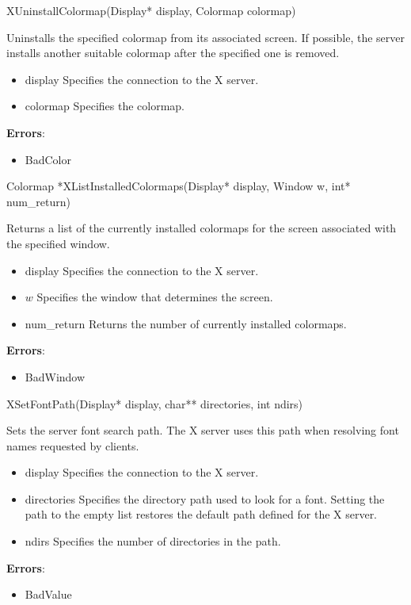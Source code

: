 \documentclass{report}
\begin{document}
\begin{itemize}
        \begin{cppcode}
            XUninstallColormap(Display* display, Colormap colormap)
        \end{cppcode}
        \bigbreak \noindent
        Uninstalls the specified colormap from its associated screen. If possible, the server installs another suitable colormap after the specified one is removed.
        \begin{itemize}
            \item display Specifies the connection to the X server.
            \item colormap Specifies the colormap.
        \end{itemize}
        \bigbreak \noindent
        \textbf{Errors}:
        \begin{itemize}
            \item BadColor
        \end{itemize}

        \begin{cppcode}
        Colormap *XListInstalledColormaps(Display* display, Window w, int* num_return)
        \end{cppcode}
        \bigbreak \noindent
        Returns a list of the currently installed colormaps for the screen associated with the specified window.
        \begin{itemize}
            \item display Specifies the connection to the X server.
            \item $w$ Specifies the window that determines the screen.
            \item num\_return Returns the number of currently installed colormaps.
        \end{itemize}
        \bigbreak \noindent
        \textbf{Errors}:
        \begin{itemize}
            \item BadWindow
        \end{itemize}

        \begin{cppcode}
        XSetFontPath(Display* display, char** directories, int ndirs)
        \end{cppcode}
        \bigbreak \noindent
        Sets the server font search path. The X server uses this path when resolving font names requested by clients.
        \begin{itemize}
            \item display Specifies the connection to the X server.
            \item directories Specifies the directory path used to look for a font. Setting the path to the empty list restores the default path defined for the X server.
            \item ndirs Specifies the number of directories in the path.
        \end{itemize}
        \bigbreak \noindent
        \textbf{Errors}:
        \begin{itemize}
            \item BadValue
        \end{itemize}


\end{itemize}
\end{document}
